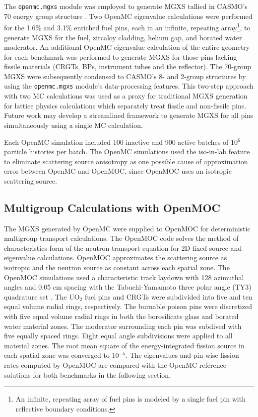 The \texttt{openmc.mgxs} module was employed to generate MGXS tallied in CASMO's 70 energy group structure \cite{rhodes2006casmo}. Two OpenMC eigenvalue calculations were performed for the 1.6\% and 3.1\% enriched fuel pins, each in an infinite, repeating array\footnote{An infinite, repeating array of fuel pins is modeled by a single fuel pin with reflective boundary conditions.}, to generate MGXS for the fuel, zircaloy cladding, helium gap, and borated water moderator. An additional OpenMC eigenvalue calculation of the entire geometry for each benchmark was performed to generate MGXS for those pins lacking fissile materials (CRGTs, BPs, instrument tubes and the reflector). The 70-group MGXS were subsequently condensed to CASMO's 8- and 2-group structures by using the \texttt{openmc.mgxs} module's data-processing features. This two-step approach with two MC calculations was used as a proxy for traditional MGXS generation for lattice physics calculations which separately treat fissile and non-fissile pins. Future work may develop a streamlined framework to generate MGXS for all pins simultaneously using a single MC calculation.

Each OpenMC simulation included 100 inactive and 900 active batches of 10$^{6}$ particle histories per batch. The OpenMC simulations used the iso-in-lab feature to eliminate scattering source anisotropy as one possible cause of approximation error between OpenMC and OpenMOC, since OpenMOC uses an isotropic scattering source.


\subsection{Multigroup Calculations with OpenMOC}
\label{subsec:openmoc}

The MGXS generated by OpenMC were supplied to OpenMOC \cite{boyd2014openmoc} for deterministic multigroup transport calculations. The OpenMOC code solves the method of characteristics form of the neutron transport equation for 2D fixed source and eigenvalue calculations. OpenMOC approximates the scattering source as isotropic and the neutron source as constant across each spatial zone. The OpenMOC simulations used a characteristic track laydown with 128 azimuthal angles and 0.05 cm spacing with the Tabuchi-Yamamoto three polar angle (TY3) quadrature set \cite{yamamoto2007}. The UO$_2$ fuel pins and CRGTs were subdivided into five and ten equal volume radial rings, respectively. The burnable poison pins were discretized with five equal volume radial rings in both the borosilicate glass and borated water material zones. The moderator surrounding each pin was subdived with five equally spaced rings. Eight equal angle subdivisions were applied to all material zones. The root mean square of the energy-integrated fission source in each spatial zone was converged to 10$^{-5}$. The eigenvalues and pin-wise fission rates computed by OpenMOC are compared with the OpenMC reference solutions for both benchmarks in the following section.


